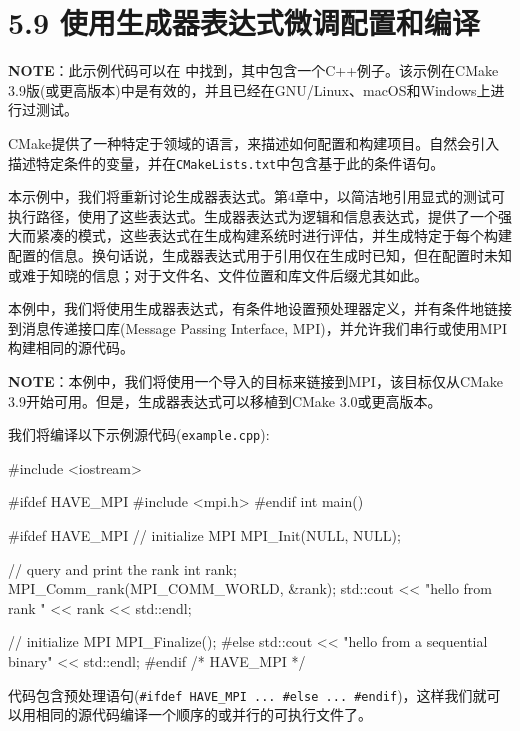 \section{5.9 使用生成器表达式微调配置和编译}

\begin{myInfoBox}
\textbf{NOTE}：此示例代码可以在  中找到，其中包含一个C++例子。该示例在CMake 3.9版(或更高版本)中是有效的，并且已经在GNU/Linux、macOS和Windows上进行过测试。
\end{myInfoBox}

CMake提供了一种特定于领域的语言，来描述如何配置和构建项目。自然会引入描述特定条件的变量，并在\texttt{CMakeLists.txt}中包含基于此的条件语句。

本示例中，我们将重新讨论生成器表达式。第4章中，以简洁地引用显式的测试可执行路径，使用了这些表达式。生成器表达式为逻辑和信息表达式，提供了一个强大而紧凑的模式，这些表达式在生成构建系统时进行评估，并生成特定于每个构建配置的信息。换句话说，生成器表达式用于引用仅在生成时已知，但在配置时未知或难于知晓的信息；对于文件名、文件位置和库文件后缀尤其如此。

本例中，我们将使用生成器表达式，有条件地设置预处理器定义，并有条件地链接到消息传递接口库(Message Passing Interface, MPI)，并允许我们串行或使用MPI构建相同的源代码。

\begin{myInfoBox}
\textbf{NOTE}：本例中，我们将使用一个导入的目标来链接到MPI，该目标仅从CMake 3.9开始可用。但是，生成器表达式可以移植到CMake 3.0或更高版本。
\end{myInfoBox}


我们将编译以下示例源代码(\texttt{example.cpp}):

\begin{codebox}[cpp]
#include <iostream>

#ifdef HAVE_MPI
#include <mpi.h>
#endif
int main()
{
#ifdef HAVE_MPI
  // initialize MPI
  MPI_Init(NULL, NULL);

  // query and print the rank
  int rank;
  MPI_Comm_rank(MPI_COMM_WORLD, &rank);
  std::cout << "hello from rank " << rank << std::endl;

  // initialize MPI
  MPI_Finalize();
#else
  std::cout << "hello from a sequential binary" << std::endl;
#endif /* HAVE_MPI */
}
\end{codebox}

代码包含预处理语句(\texttt{\#ifdef HAVE\_MPI ... \#else ... \#endif})，这样我们就可以用相同的源代码编译一个顺序的或并行的可执行文件了。

